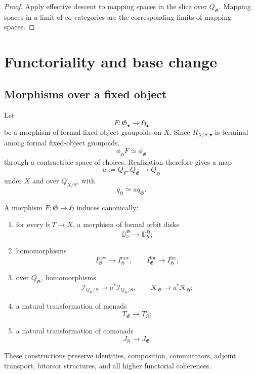 \begin{proof}
Apply effective descent to mapping spaces in the slice over
$Q_{\mathfrak G}$.  Mapping spaces in a limit of $\infty$-categories are the
corresponding limits of mapping spaces.
\end{proof}


\section{Functoriality and base change}
\label{sec:flg-functoriality}

\subsection{Morphisms over a fixed object}

Let
\[
    F:\mathfrak G_\bullet\longrightarrow\mathfrak H_\bullet
\]
be a morphism of formal fixed-object groupoids on $X$.  Since
$R_{X/S,\bullet}$ is terminal among formal fixed-object groupoids,
\[
    \phi_{\mathfrak H}F
    \simeq
    \phi_{\mathfrak G}
\]
through a contractible space of choices.  Realization therefore gives a map
\[
    a:=Q_F:
    Q_{\mathfrak G}\longrightarrow Q_{\mathfrak H}
\]
under $X$ and over $Q_{X/S}$, with
\[
    q_{\mathfrak H}\simeq aq_{\mathfrak G}.
\]

\begin{proposition}
\label{prop:formal-gpd-functoriality-fixed-X}
A morphism
$F:\mathfrak G\to\mathfrak H$
induces canonically:
\begin{enumerate}
    \item for every $b:T\to X$, a morphism of formal orbit disks
    \[
        \mathbb D^{\mathfrak G}_b
        \longrightarrow
        \mathbb D^{\mathfrak H}_b;
    \]
    \item homomorphisms
    \[
        I^{\mathrm{raw}}_{\mathfrak G}
        \longrightarrow
        I^{\mathrm{raw}}_{\mathfrak H},
        \qquad
        I^{\mathrm{for}}_{\mathfrak G}
        \longrightarrow
        I^{\mathrm{for}}_{\mathfrak H};
    \]
    \item over $Q_{\mathfrak G}$, homomorphisms
    \[
        \mathcal I_{Q_{\mathfrak G}/S}
        \longrightarrow
        a^*\mathcal I_{Q_{\mathfrak H}/S},
        \qquad
        \mathcal K_{\mathfrak G}
        \longrightarrow
        a^*\mathcal K_{\mathfrak H};
    \]
    \item a natural transformation of monads
    \[
        T_{\mathfrak G}
        \longrightarrow
        T_{\mathfrak H};
    \]
    \item a natural transformation of comonads
    \[
        J_{\mathfrak H}
        \longrightarrow
        J_{\mathfrak G}.
    \]
\end{enumerate}
These constructions preserve identities, composition, commutators,
adjoint transport, bitorsor structures, and all higher functorial
coherences.
\end{proposition}

